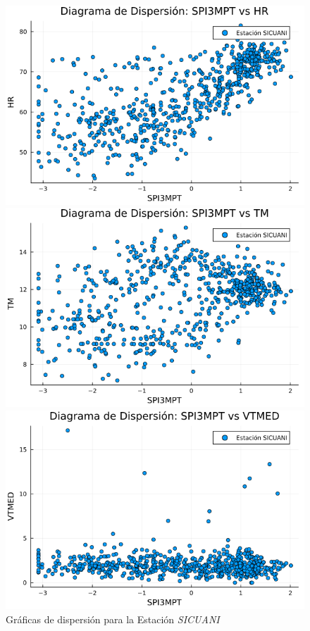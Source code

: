 \begin{figure}[htbp]
\centering
\caption{Gráficas de dispersión para la Estación \textit{SICUANI}}
\begin{minipage}{0.32\textwidth}
    \centering
    \includegraphics[width=\linewidth]{Capitulos/Scaterplot/SICUANI_SPI3MPT_vs_HR.png}
\end{minipage}\hfill
\begin{minipage}{0.32\textwidth}
    \centering
    \includegraphics[width=\linewidth]{Capitulos/Scaterplot/SICUANI_SPI3MPT_vs_TM.png}
\end{minipage}\hfill
\begin{minipage}{0.32\textwidth}
    \centering
    \includegraphics[width=\linewidth]{Capitulos/Scaterplot/SICUANI_SPI3MPT_vs_VTMED.png}

\end{minipage}
\end{figure}
